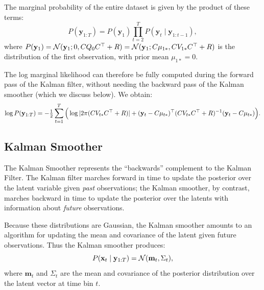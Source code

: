 \documentclass[10pt]{article}
\newcommand{\vx}{\mathbf{x}}
\newcommand{\vy}{\mathbf{y}}
\newcommand{\vm}{\mathbf{m}}
\begin{document}
The marginal probability of the entire dataset is given by the product of these
terms:
\begin{equation}
  \label{eq:margli}
  P(\vy_{1:T})  = P(\vy_1) \prod_{t=2}^T P(\vy_t \mid \vy_{1:t-1}), 
\end{equation}
where $P(\vy_1) =
\Nrm(\vy_1; 0, C Q_0 C\trp +R)
= \Nrm(\vy_1; C\mu_{1*}, C V_{1*} C\trp + R)$ is the distribution of
the first observation, with prior mean $\mu_{1*} = 0$.

The log marginal likelihood can therefore be fully computed during the
forward pass of the Kalman filter, without needing the backward pass
of the Kalman smoother (which we discuss below).  We obtain:
\begin{equation}
  \label{eq:logmargli}
  \log P(\vy_{1:T}) = -\tonehlf \sum_{t=1}^T \Big(
  \log |2\pi (CV_{t*}C\trp + R)| + 
  (\vy_t- C \mu_{t*})\trp (CV_{t*}C\trp+R)\inv   (\vy_t- C
  \mu_{t*})\Big).
\end{equation}



\subsection{Kalman Smoother}
\label{sec:ksmooth} 
The Kalman Smoother represents the ``backwards'' complement to the
Kalman Filter. The Kalman filter marches forward in time to update the
posterior over the latent variable given {\it past} observations; the
Kalman smoother, by contrast, marches backward in time to update the
posterior over the latents with information about {\it future}
observations.

Because these distributions are Gaussian, the Kalman smoother amounts
to an algorithm for updating the mean and covariance of the latent
given future observations. Thus the Kalman smoother produces:
\begin{equation}
  \label{eq:15}
  P(\vx_t \mid \vy_{1:T}) = \Nrm( \vm_t, \Sigma_t),  
\end{equation}
where $\vm_t$ and $\Sigma_t$ are the mean and covariance of the
posterior distribution over the latent vector at time bin $t$.
\end{document}
